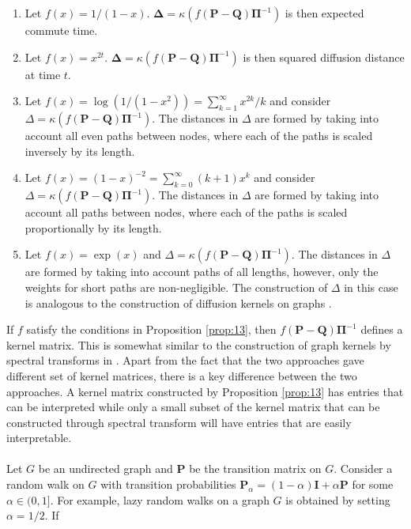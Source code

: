 \documentclass[10pt,twocolumn]{article}
\numberwithin{equation}{section}
\begin{document}
\begin{enumerate}
\item Let $f(x) = 1/(1-x)$. $\bm{\Delta} = \kappa(f(\mathbf{P} -
  \mathbf{Q})\bm{\Pi}^{-1})$ is then expected commute time.
\item Let $f(x) = x^{2t}$. $\bm{\Delta} = \kappa(f(\mathbf{P} -
  \mathbf{Q})\bm{\Pi}^{-1})$ is then squared diffusion distance at
  time $t$. 
\item Let $f(x) = \log(1/(1-x^2)) = \sum_{k=1}^{\infty}{x^{2k}/k}$ and
  consider $\Delta = \kappa(f(\mathbf{P} -
  \mathbf{Q})\bm{\Pi}^{-1})$. The distances in $\Delta$ are formed by
  taking into account all even paths between nodes, where each of the
  paths is scaled inversely by its length.
\item Let $f(x) = (1-x)^{-2} = \sum_{k=0}^{\infty}{(k+1)x^k}$ and
  consider $\Delta = \kappa(f(\mathbf{P} -
  \mathbf{Q})\bm{\Pi}^{-1})$. The distances in $\Delta$ are formed by
  taking into account all paths between nodes, where each of the paths
  is scaled proportionally by its length.
\item Let $f(x) = \exp(x)$ and $\Delta = \kappa(f(\mathbf{P}
  - \mathbf{Q})\bm{\Pi}^{-1})$. The distances in $\Delta$ are formed by
  taking into account paths of all lengths, however, only the weights for
  short paths are non-negligible. The construction of $\Delta$ in this
  case is analogous to the construction of diffusion
  kernels on graphs \cite{kondor02:_diffus}. 
\end{enumerate}
%
%
If $f$ satisfy the conditions in Proposition \ref{prop:13}, then
$f(\mathbf{P} - \mathbf{Q})\bm{\Pi}^{-1}$ defines a kernel
matrix. This is somewhat similar to the construction of graph kernels
by spectral transforms in
\cite{zhu05:_semi,chapelle03:_clust_kernel_semi_super_learn,smola03:_kernel}.
Apart from the fact that the two approaches gave different set of
kernel matrices, there is a key difference between the two
approaches. A kernel matrix constructed by Proposition \ref{prop:13}
has entries that can be interpreted while only a small subset of the
kernel matrix that can be constructed through spectral transform will
have entries that are easily interpretable. \\ \\
\noindent
Let $G$ be an undirected graph and $\mathbf{P}$ be the transition
matrix on $G$. Consider a random walk on $G$ with transition
probabilities $\mathbf{P}_{\alpha} = (1 - \alpha)\mathbf{I} +
\alpha \mathbf{P}$ for some $\alpha \in (0,1]$. For example, lazy
random walks on a graph $G$ is obtained by setting $\alpha = 1/2$. If
\end{document}
